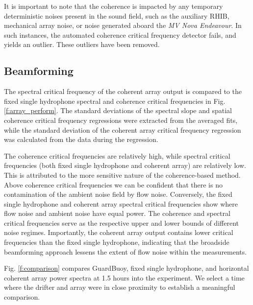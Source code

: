 \documentclass[12pt,journal,onecolumn]{IEEEtran}
\begin{document}
It is important to note that the coherence is impacted by any temporary deterministic noises present in the sound field, such as the auxiliary RHIB, mechanical array noise, or noise generated aboard the \emph{MV Nova Endeavour}. In such instances, the automated coherence critical frequency detector fails, and yields an outlier. These outliers have been removed.




\subsection{Beamforming}
The spectral critical frequency of the coherent array output is compared to the fixed single hydrophone spectral and coherence critical frequencies in Fig. \ref{f:array_perform}. 
The standard deviations of the spectral slope and spatial coherence critical frequency regressions were extracted from the averaged fits, while the standard deviation of the coherent array critical frequency regression was calculated from the data during the regression.

The coherence critical frequencies are relatively high, while spectral critical frequencies (both fixed single hydrophone and coherent array) are relatively low. This is attributed to the more sensitive nature of the coherence-based method. Above coherence critical frequencies we can be confident that there is no contamination of the ambient noise field by flow noise. Conversely, the fixed single hydrophone and coherent array spectral critical frequencies show where flow noise and ambient noise have equal power. The coherence and spectral critical frequencies serve as the respective upper and lower bounds of different noise regimes. Importantly, the coherent array output contains lower critical frequencies than the fixed single hydrophone, indicating that the broadside beamforming approach lessens the extent of flow noise within the measurements. 


Fig. \ref{f:comparison} compares GuardBuoy, fixed single hydrophone, and horizontal coherent array power spectra at 1.5 hours into the experiment. We select a time where the drifter and array were in close proximity to establish a meaningful comparison.
\end{document}
